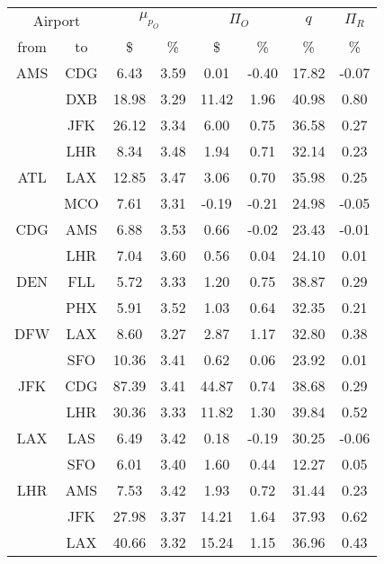 \begin{table}
\begin{center}
\begin{tabular}{c c | c c | c c | c | c }
\toprule
\multicolumn{2}{c|}{Airport}  &  \multicolumn{2}{c|}{$\mu_{p_O}$} & \multicolumn{2}{c|}{$\Pi_O$}  &  $q$  & $\Pi_R$ \\[.4ex]
from  &  to  &  \$  & \%  &  \$  & \%  & \%  & \% \\
    \midrule
AMS  &  CDG  &    6.43  &  3.59  &    0.01  &  -0.40  &  17.82  &  -0.07 \\
~    &  DXB  &   18.98  &  3.29  &   11.42  &  1.96  &  40.98  &  0.80 \\
~    &  JFK  &   26.12  &  3.34  &    6.00  &  0.75  &  36.58  &  0.27 \\
~    &  LHR  &    8.34  &  3.48  &    1.94  &  0.71  &  32.14  &  0.23 \\[.5ex]
ATL  &  LAX  &   12.85  &  3.47  &    3.06  &  0.70  &  35.98  &  0.25 \\
~    &  MCO  &    7.61  &  3.31  &   -0.19  &  -0.21  &  24.98  &  -0.05 \\[.5ex]
CDG  &  AMS  &    6.88  &  3.53  &    0.66  &  -0.02  &  23.43  &  -0.01 \\
~    &  LHR  &    7.04  &  3.60  &    0.56  &  0.04  &  24.10  &  0.01 \\[.5ex]
DEN  &  FLL  &    5.72  &  3.33  &    1.20  &  0.75  &  38.87  &  0.29 \\
~    &  PHX  &    5.91  &  3.52  &    1.03  &  0.64  &  32.35  &  0.21 \\[.5ex]
DFW  &  LAX  &    8.60  &  3.27  &    2.87  &  1.17  &  32.80  &  0.38 \\
~    &  SFO  &   10.36  &  3.41  &    0.62  &  0.06  &  23.92  &  0.01 \\[.5ex]
JFK  &  CDG  &   87.39  &  3.41  &   44.87  &  0.74  &  38.68  &  0.29 \\
~    &  LHR  &   30.36  &  3.33  &   11.82  &  1.30  &  39.84  &  0.52 \\[.5ex]
LAX  &  LAS  &    6.49  &  3.42  &    0.18  &  -0.19  &  30.25  &  -0.06 \\
~    &  SFO  &    6.01  &  3.40  &    1.60  &  0.44  &  12.27  &  0.05 \\[.5ex]
LHR  &  AMS  &    7.53  &  3.42  &    1.93  &  0.72  &  31.44  &  0.23 \\
~    &  JFK  &   27.98  &  3.37  &   14.21  &  1.64  &  37.93  &  0.62 \\
~    &  LAX  &   40.66  &  3.32  &   15.24  &  1.15  &  36.96  &  0.43 \\

\end{tabular}
\end{center}
\end{table}
